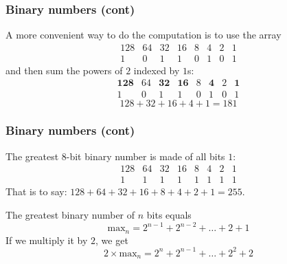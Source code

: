 %
\begin{frame}
\frametitle{Binary numbers (cont)}

A more convenient way to do the computation is to use the array
\[
\begin{array}{rrrrrrrr}
128 & 64 & 32 & 16 & 8 & 4 & 2 & 1\\
\hline
  1 &  0 &  1 &  1 & 0 & 1 & 0 & 1
\end{array}
\]
and then sum the powers of \(2\) indexed by \(1\)s:
\[
\begin{array}{rrrrrrrr}
\mathbf{128} & 64 & \mathbf{32} & \mathbf{16} & 8 & \mathbf{4} & 2 &
\mathbf{1}\\
\hline
  1 &  0 &  1 &  1 & 0 & 1 & 0 & 1
\end{array}
\]
\[
128 + 32 + 16 + 4 + 1 = 181
\]

\end{frame}

% 
\begin{frame}
\frametitle{Binary numbers (cont)}

The greatest \(8\)-bit binary number is made of all bits \(1\):
\[
\begin{array}{rrrrrrrr}
128 & 64 & 32 & 16 & 8 & 4 & 2 & 1\\
\hline
  1 &  1 &  1 &  1 & 1 & 1 & 1 & 1
\end{array}
\]
That is to say: \(128 + 64 + 32 + 16 + 8 + 4 + 2 + 1 = 255\).

\bigskip

The greatest binary number of \(n\) bits equals
\begin{equation}
\text{max}_{n} = 2^{n-1} + 2^{n-2} + \dots + 2 + 1
\label{max}
\end{equation}
If we multiply it by \(2\), we get 
\begin{equation}
2 \times \text{max}_{n} = 2^{n} + 2^{n-1} + \dots + 2^{2} + 2
\label{double_max}
\end{equation}

\end{frame}


